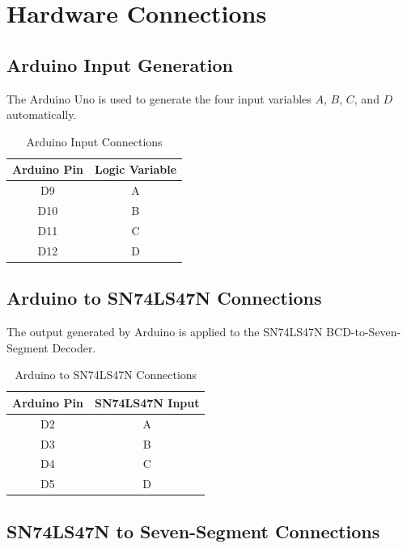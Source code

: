 \documentclass[12pt,a4paper]{article}
\begin{document}
\section*{Hardware Connections}

\subsection*{Arduino Input Generation}

The Arduino Uno is used to generate the four input variables \(A\), \(B\), \(C\), and \(D\) automatically.

\begin{table}[H]
\centering
\caption{Arduino Input Connections}
\label{tab:arduino_inputs}
\begin{tabular}{|c|c|}
\hline
\textbf{Arduino Pin} & \textbf{Logic Variable} \\ \hline
D9  & A \\ \hline
D10 & B \\ \hline
D11 & C \\ \hline
D12 & D \\ \hline
\end{tabular}
\end{table}

\subsection*{Arduino to SN74LS47N Connections}

The output generated by Arduino is applied to the SN74LS47N BCD-to-Seven-Segment Decoder.

\begin{table}[H]
\centering
\caption{Arduino to SN74LS47N Connections}
\label{tab:arduino_7447}
\begin{tabular}{|c|c|}
\hline
\textbf{Arduino Pin} & \textbf{SN74LS47N Input} \\ \hline
D2 & A \\ \hline
D3 & B \\ \hline
D4 & C \\ \hline
D5 & D \\ \hline
\end{tabular}
\end{table}

\subsection*{SN74LS47N to Seven-Segment Connections}
\end{document}
